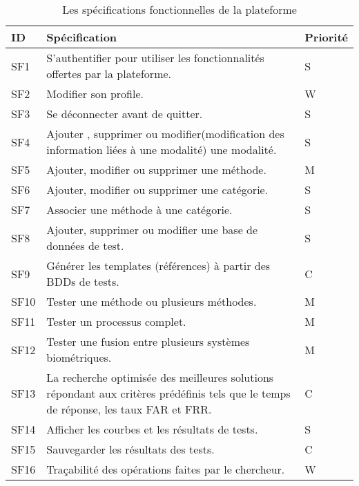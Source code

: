 \begin{table}[H]
	\centering
	\label{specifFonct}
	\begin{tabular}{|l | p{13.5cm} | l|}
		\hline
		ID  & Spécification                                                                                                        & Priorité \\ \hline
		SF1	&	S’authentifier pour utiliser les fonctionnalités offertes par la plateforme.	&	 S 	\\ \hline
		SF2	&	Modifier son profile. 	&	 W	\\ \hline
		SF3	&	Se déconnecter avant de quitter. 	&	 S 	\\ \hline
		SF4	&	Ajouter , supprimer ou modifier(modification des information liées à une modalité) une modalité. 	&	 S 	\\ \hline
		SF5	&	Ajouter, modifier ou supprimer une méthode. 	&	M	\\ \hline
		SF6	&	Ajouter, modifier ou supprimer une catégorie. 	&	S	\\ \hline
		SF7	&	Associer une méthode à une catégorie. 	&	S	\\ \hline
		SF8	&	Ajouter, supprimer ou modifier une base de données de test.  	&	 S 	\\ \hline
		SF9	&	Générer les templates (références) à partir des BDDs de tests.	&	 C 	\\ \hline
		SF10	&	Tester une méthode ou plusieurs méthodes. 	&	M	\\ \hline
		SF11	&	Tester un processus complet. 	&	M	\\ \hline
		SF12	&	Tester une fusion entre plusieurs systèmes biométriques. 	&	M	\\ \hline
		SF13	&	La recherche optimisée des meilleures solutions répondant aux critères prédéfinis tels que le temps de réponse, les taux FAR et FRR.  	&	 C 	\\ \hline
		SF14	&	Afficher les courbes et les résultats de tests. 	&	 S 	\\ \hline
		SF15	&	Sauvegarder les résultats des tests. 	&	C	\\ \hline
		SF16	&	Traçabilité des opérations faites par le chercheur. 	&	 W 	\\ \hline
		
	\end{tabular}
		\caption{Les spécifications fonctionnelles de la plateforme}
\end{table}


